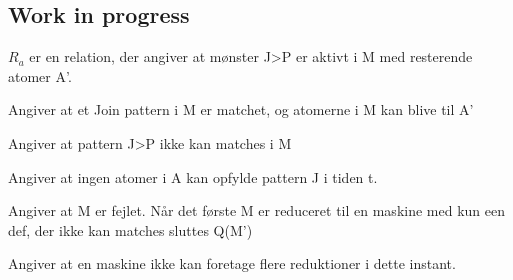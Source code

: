 \newpage
\newpage

\subsection*{Work in progress}
\setlength\lineskip{1em}


$R_a$ er en relation, der angiver at mønster J>P er aktivt i M med resterende atomer A'.


Angiver at et Join pattern i M er matchet, og atomerne i M kan blive til A'


Angiver at pattern J>P ikke kan matches i M


Angiver at ingen atomer i A kan opfylde pattern J i tiden t.


Angiver at M er fejlet. Når det første M er reduceret til en maskine med kun een def, der ikke kan matches sluttes Q(M')


Angiver at en maskine ikke kan foretage flere reduktioner i dette instant.


